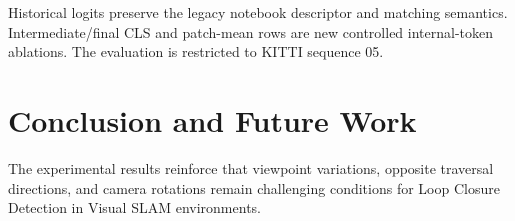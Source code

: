 \documentclass{ieeeaccess}
\begin{document}
\begin{table}[t]
    \centering
    \caption{\textcolor{red}{Controlled ViT-B/16 descriptor ablation on KITTI sequence 05. The best value in each metric column is shown in bold.}}
    \label{tab:vit_descriptor_ablation}
    {\color{red}
    \setlength{\tabcolsep}{3.5pt}
    \vspace{2pt}

    \footnotesize Historical logits preserve the legacy notebook descriptor and matching semantics. Intermediate/final CLS and patch-mean rows are new controlled internal-token ablations. The evaluation is restricted to KITTI sequence 05.
    }
\end{table}

\FloatBarrier

\raggedbottom

\section{Conclusion and Future Work}
\label{sec:concl}

The experimental results reinforce that viewpoint variations, opposite traversal directions, and camera rotations remain challenging conditions for Loop Closure Detection in Visual SLAM environments.
\end{document}
